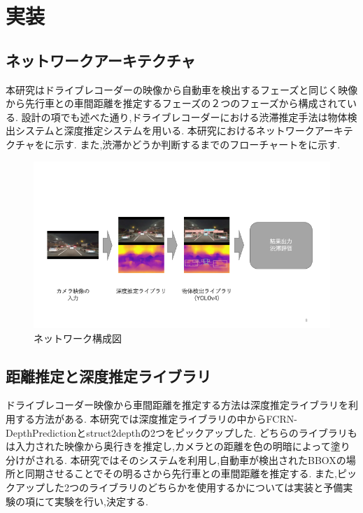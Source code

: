 \newpage
\section{実装}
\subsection{ネットワークアーキテクチャ}
本研究はドライブレコーダーの映像から自動車を検出するフェーズと同じく映像から先行車との車間距離を推定するフェーズの２つのフェーズから構成されている.
設計の項でも述べた通り,ドライブレコーダーにおける渋滞推定手法は物体検出システムと深度推定システムを用いる.
本研究におけるネットワークアーキテクチャをに示す.
また,渋滞かどうか判断するまでのフローチャートをに示す.

\begin{figure}[htbp]
  \begin{center}
    \includegraphics[width=12cm]{figs/system_net.png}
    \caption{ネットワーク構成図}
    \label{fig:system_arch}
  \end{center}
\end{figure}



\subsection{距離推定と深度推定ライブラリ}
ドライブレコーダー映像から車間距離を推定する方法は深度推定ライブラリを利用する方法がある.
本研究では深度推定ライブラリの中からFCRN-DepthPrediction\cite{laina2016deeper}とstruct2depth\cite{casser2019struct2depth}の2つをピックアップした.
どちらのライブラリもは入力された映像から奥行きを推定し,カメラとの距離を色の明暗によって塗り分けがされる.
本研究ではそのシステムを利用し,自動車が検出されたBBOXの場所と同期させることでその明るさから先行車との車間距離を推定する.
また,ピックアップした2つのライブラリのどちらかを使用するかについては実装と予備実験の項にて実験を行い,決定する.

